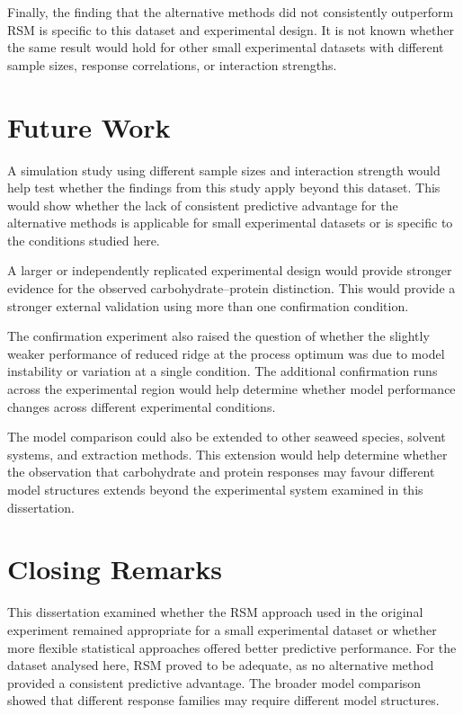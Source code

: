 \documentclass[MScDSA]{uccthesis}
\begin{document}
Finally, the finding that the alternative methods did not consistently outperform RSM is specific to this dataset and experimental design. It is not known whether the same result would hold for other small experimental datasets with different sample sizes, response correlations, or interaction strengths.

\section{Future Work}
A simulation study using different sample sizes and interaction strength would help test whether the findings from this study apply beyond this dataset. This would show whether the lack of consistent predictive advantage for the alternative methods is applicable for small experimental datasets or is specific to the conditions studied here.

A larger or independently replicated experimental design would provide stronger evidence for the observed carbohydrate--protein distinction. This would provide a stronger external validation using more than one confirmation condition.

The confirmation experiment also raised the question of whether the slightly weaker performance of reduced ridge at the process optimum was due to model instability or variation at a single condition. The additional confirmation runs across the experimental region would help determine whether model performance changes across different experimental conditions.

The model comparison could also be extended to other seaweed species, solvent systems, and extraction methods. This extension would help determine whether the observation that carbohydrate and protein responses may favour different model structures extends beyond the experimental system examined in this dissertation.


\section{Closing Remarks}
This dissertation examined whether the RSM approach used in the original experiment remained appropriate for a small experimental dataset or whether more flexible statistical approaches offered better predictive performance. For the dataset analysed here, RSM proved to be adequate, as no alternative method provided a consistent predictive advantage. The broader model comparison showed that different response families may require different model structures.
\end{document}

